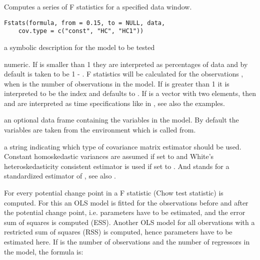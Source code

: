 \begin{Description}\relax
Computes a series of F statistics for a specified data window.\end{Description}
\begin{Usage}
\begin{verbatim}
Fstats(formula, from = 0.15, to = NULL, data,
    cov.type = c("const", "HC", "HC1"))\end{verbatim}
\end{Usage}
\begin{Arguments}
\begin{ldescription}
\item[\code{formula}] a symbolic description for the model to be tested
\item[\code{from, to}] numeric. If  is smaller than 1 they are
interpreted as percentages of data and by default  is taken to be
1 - . F statistics will be calculated for the observations
, when  is the number of observations in the
model. If  is greater than 1 it is interpreted to be the index
and  defaults to . If  is a vector with
two elements, then  and  are interpreted as time
specifications like in , see also the examples.
\item[\code{data}] an optional data frame containing the variables in the model. By
default the variables are taken from the environment which  is
called from.
\item[\code{cov.type}] a string indicating which type of covariance matrix
estimator should be used. Constant homoskedastic variances are assumed
if set to  and White's heteroskedasticity consistent
estimator is used if set to . And  stands for a
standardized estimator of , see also .
\end{ldescription}
\end{Arguments}
\begin{Details}\relax
For every potential change point in  a F statistic (Chow
test statistic) is computed. For this an OLS model is fitted for the
observations before and after the potential change point, i.e. 
parameters have to be estimated, and the error sum of squares is computed (ESS).
Another OLS model for all obervations with a restricted sum of squares (RSS) is
computed, hence  parameters have to be estimated here. If  is 
the number of observations and  the number of regressors in the model,
the formula is:

\end{Details}
